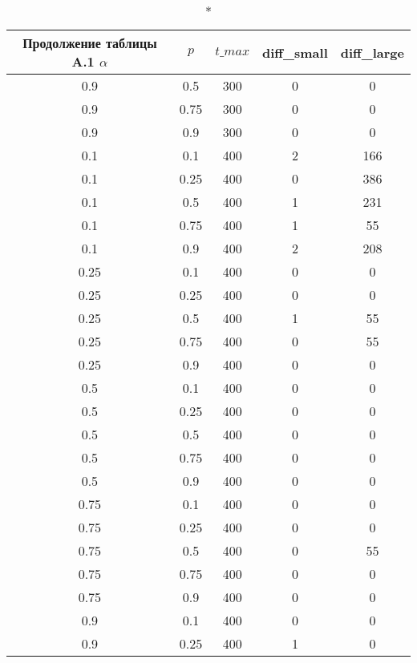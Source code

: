 \begin{longtable}[c]{|c|c|c|c|c|}
\caption*{Продолжение таблицы A.1}
\hline
$\alpha$ & $p$ & $t\_max$ & diff\_small & diff\_large
\tabularnewline 
\hline
0.9 & 0.5 & 300 & 0 & 0 \\ 
\hline
0.9 & 0.75 & 300 & 0 & 0 \\ 
\hline
0.9 & 0.9 & 300 & 0 & 0 \\ 
\hline
0.1 & 0.1 & 400 & 2 & 166 \\ 
\hline
0.1 & 0.25 & 400 & 0 & 386 \\ 
\hline
0.1 & 0.5 & 400 & 1 & 231 \\ 
\hline
0.1 & 0.75 & 400 & 1 & 55 \\ 
\hline
0.1 & 0.9 & 400 & 2 & 208 \\ 
\hline
0.25 & 0.1 & 400 & 0 & 0 \\ 
\hline
0.25 & 0.25 & 400 & 0 & 0 \\ 
\hline
0.25 & 0.5 & 400 & 1 & 55 \\ 
\hline
0.25 & 0.75 & 400 & 0 & 55 \\ 
\hline
0.25 & 0.9 & 400 & 0 & 0 \\ 
\hline
0.5 & 0.1 & 400 & 0 & 0 \\ 
\hline
0.5 & 0.25 & 400 & 0 & 0 \\ 
\hline
0.5 & 0.5 & 400 & 0 & 0 \\ 
\hline
0.5 & 0.75 & 400 & 0 & 0 \\ 
\hline
0.5 & 0.9 & 400 & 0 & 0 \\ 
\hline
0.75 & 0.1 & 400 & 0 & 0 \\ 
\hline
0.75 & 0.25 & 400 & 0 & 0 \\ 
\hline
0.75 & 0.5 & 400 & 0 & 55 \\ 
\hline
0.75 & 0.75 & 400 & 0 & 0 \\ 
\hline
0.75 & 0.9 & 400 & 0 & 0 \\ 
\hline
0.9 & 0.1 & 400 & 0 & 0 \\ 
\hline
0.9 & 0.25 & 400 & 1 & 0 \\ 
\hline
\end{longtable}

